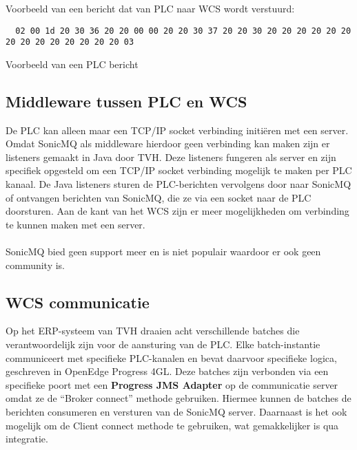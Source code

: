 Voorbeeld van een bericht dat van PLC naar WCS wordt verstuurd: 
\begin{listing}[h!]
\begin{verbatim}
  02 00 1d 20 30 36 20 20 00 00 20 20 30 37 20 20 30 20 20 20 20 20 20 20 20 20 20 20 20 20 20 03
\end{verbatim}
\caption[Voorbeeld PLC bericht]{Voorbeeld van een PLC bericht}
\end{listing}

\subsection{Middleware tussen PLC en WCS}
De PLC kan alleen maar een TCP/IP socket verbinding initiëren met een server.
Omdat SonicMQ als middleware hierdoor geen verbinding kan maken zijn er listeners gemaakt in Java door TVH.
Deze listeners fungeren als server en zijn specifiek opgesteld om een TCP/IP socket verbinding mogelijk te maken per PLC kanaal.
De Java listeners sturen de PLC-berichten vervolgens door naar SonicMQ of ontvangen berichten van SonicMQ, 
die ze via een socket naar de PLC doorsturen.
Aan de kant van het WCS zijn er meer mogelijkheden om verbinding te kunnen maken met een server.
\\\\
SonicMQ bied geen support meer en is niet populair waardoor er ook geen community is.

\subsection{WCS communicatie} 
Op het ERP-systeem van TVH draaien acht verschillende batches die verantwoordelijk zijn voor de aansturing van de PLC. 
Elke batch-instantie communiceert met specifieke PLC-kanalen en bevat daarvoor specifieke logica, geschreven in OpenEdge Progress 4GL.
Deze batches zijn verbonden via een specifieke poort met een \textbf{Progress JMS Adapter} op de communicatie server omdat ze de ``Broker connect'' methode gebruiken.
Hiermee kunnen de batches de berichten consumeren en versturen van de SonicMQ server.
Daarnaast is het ook mogelijk om de Client connect methode te gebruiken, wat gemakkelijker is qua integratie.

